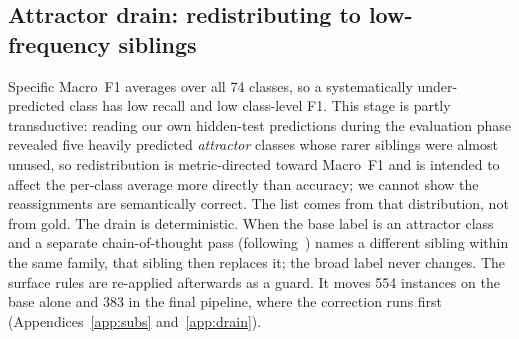 \documentclass[11pt]{article}
\begin{document}
\subsection{Attractor drain: redistributing to low-frequency siblings}
Specific Macro~F1 averages over all 74 classes, so a systematically under-predicted class has low
recall and low class-level F1. This stage is partly transductive: reading our own hidden-test
predictions during the evaluation phase revealed five heavily predicted \emph{attractor}
classes whose rarer siblings were almost unused, so
redistribution is metric-directed toward Macro~F1 and is intended to affect the per-class average
more directly than accuracy; we cannot show the reassignments are semantically correct. The list comes from
that distribution, not from gold. \begingroup{}
The drain is deterministic. When the base label is an attractor class and a separate
chain-of-thought pass (following~\citealp{wei2022cot}) names a different sibling within the same
family, that sibling then replaces it; the broad label never changes. The surface rules are re-applied
afterwards as a guard. It moves 554
instances on the base alone and 383 in the final pipeline, where the correction runs first
(Appendices~\ref{app:subs} and~\ref{app:drain}).\endgroup
\end{document}
